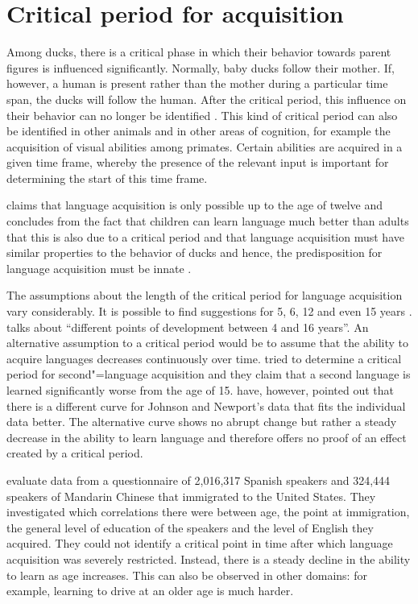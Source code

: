 \section{Critical period for acquisition}

Among ducks, there is a critical phase in which their
behavior towards parent figures is influenced significantly. Normally,
baby ducks follow their mother. If, however, a human is present rather than the mother during a particular time span, the ducks will follow the human.
After the critical period, this influence on their behavior can no longer be identified \citep{Lorenz70a-u}. This kind of critical period can also be identified
in other animals and in other areas of cognition, for example the acquisition of visual abilities among primates.
Certain abilities are acquired in a given time frame, whereby the presence of the relevant input is important for determining the start of this
time frame.

\citet{Lenneberg64a} claims that language acquisition is only possible up to the age of twelve and concludes from the fact that children can learn
language much better than adults that this is also due to a critical period and that language acquisition must have similar properties to
the behavior of ducks and hence, the predisposition for language acquisition must be innate \citep[Chapter~4]{Lenneberg67a-u}.

The assumptions about the length of the critical period for language acquisition vary
considerably. It is possible to find suggestions for 5, 6, 12 and even 15 years
\citep[]{HBW2003a}. \citet[]{Meisel2013a} talks about ``different points of
development between 4 and 16 years''. An alternative assumption to a critical period would be to assume that the ability to acquire languages decreases continuously
over time. 
\citet{JN89a} tried to determine a critical period for second"=language acquisition and they claim that a second language is learned
significantly worse from the age of 15.\nocite{Sorace2003a}
\citet*[--188]{EBJKSPP96a} have, however, pointed out that there is a different curve for Johnson and Newport's data that fits the individual data better. The alternative curve
shows no abrupt change but rather a steady decrease in the ability to learn language and therefore offers no proof of an effect created by a critical period.

\citet*{HBW2003a} evaluate data from a questionnaire of 2,016,317 Spanish speakers and 324,444 speakers of Mandarin Chinese
that immigrated to the United States. They investigated which correlations there were between age, the point at immigration, the general level of education of the speakers
and the level of English they acquired.
They could not identify a critical point in time after which language acquisition was severely restricted.
Instead, there is a steady decline in the ability to learn as age increases. This can also be observed in other
domains: for example, learning to drive at an older age is much harder.

